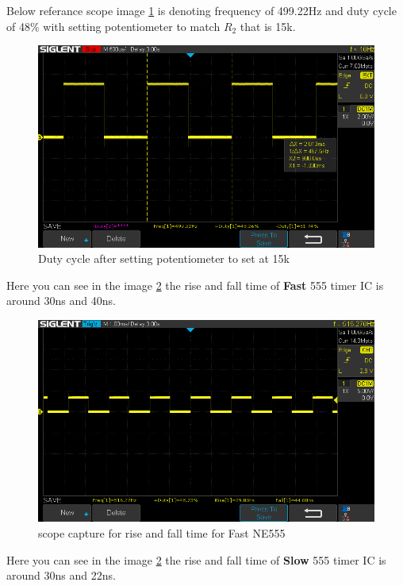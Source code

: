 \documentclass[a4paper,11pt]{article}%
\begin{document}
Below referance scope image \ref{overall_duty_cycle} is denoting frequency of 499.22Hz and duty cycle of 48\% with setting potentiometer to match $R_2$ that is 15k.
\begin{figure}[!h]
	\centering
	\includegraphics[scale=0.5]{figures/overall_duty_cycle.png}
	\caption{Duty cycle after setting potentiometer to set at 15k}
	\label{overall_duty_cycle}
\end{figure}


Here you can see in the image \ref{555_slow} the rise and fall time of \textbf{Fast} 555 timer IC is around 30ns and 40ns.
\begin{figure}[H]
	\centering
	\includegraphics[scale=0.5]{figures/555_slow}
	\caption{scope capture for rise and fall time for Fast NE555}
	\label{555_slow}
\end{figure}


Here you can see in the image \ref{555_slow} the rise and fall time of \textbf{Slow} 555 timer IC is around 30ns and 22ns.
\end{document}

